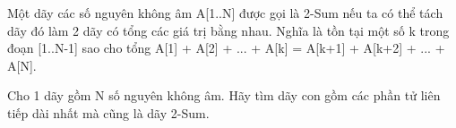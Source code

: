 Một dãy các số nguyên không âm A[1..N] được gọi là 2-Sum nếu ta có thể tách dãy đó làm 2 dãy có tổng các giá trị bằng nhau. Nghĩa là tồn tại một số k trong đoạn [1..N-1] sao cho tổng A[1] + A[2] + ... + A[k] = A[k+1] + A[k+2] + ... + A[N].  

   Cho 1 dãy gồm N số nguyên không âm. Hãy tìm dãy con gồm các phần tử liên tiếp dài nhất mà cũng là dãy 2-Sum.